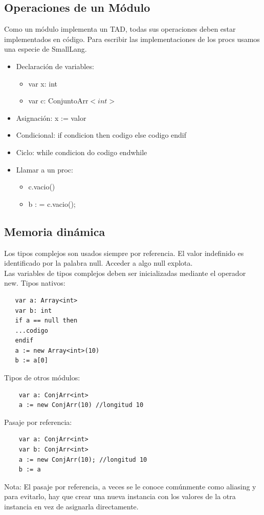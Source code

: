 \documentclass[10pt,a4paper]{article}
\begin{document}
\subsection*{Operaciones de un Módulo}
Como un módulo implementa un TAD, todas sus operaciones deben estar implementados en código.
Para escribir las implementaciones de los procs usamos una especie de SmallLang.
\begin{itemize}
    \item Declaración de variables: 
    \begin{itemize}
        \item var x: int
        \item var c: ConjuntoArr$<int>$
    \end{itemize}
    \item Asignación: x := valor
    \item Condicional: if condicion then codigo else codigo endif
    \item Ciclo: while condicion do codigo endwhile
    \item Llamar a un proc:
    \begin{itemize}
        \item c.vacio()
        \item b : = c.vacio();
    \end{itemize}
\end{itemize}
\subsection*{Memoria dinámica}
Los tipos complejos son usados siempre por referencia. El valor indefinido es identificado por la palabra null. Acceder a algo null explota. \\
Las variables de tipos complejos deben ser inicializadas mediante el operador new.
Tipos nativos: 
\begin{lstlisting}
   var a: Array<int>
   var b: int
   if a == null then 
   ...codigo
   endif
   a := new Array<int>(10)
   b := a[0]
\end{lstlisting}
Tipos de otros módulos: 
\begin{lstlisting}
    var a: ConjArr<int>
    a := new ConjArr(10) //longitud 10
\end{lstlisting}
Pasaje por referencia:
\begin{lstlisting}
    var a: ConjArr<int>
    var b: ConjArr<int>
    a := new ConjArr(10); //longitud 10
    b := a
\end{lstlisting}
Nota: El pasaje por referencia, a veces se le conoce comúnmente como aliasing y para evitarlo, hay que crear una nueva instancia con los valores de la otra instancia en vez de asignarla directamente.
\end{document}
